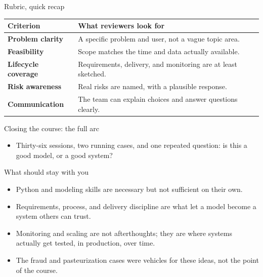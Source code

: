 \begin{frame}{Rubric, quick recap}
\begin{tabularx}{\textwidth}{>{\bfseries}l X}
Criterion & What reviewers look for \\
\toprule
Problem clarity & A specific problem and user, not a vague topic area. \\
Feasibility & Scope matches the time and data actually available. \\
Lifecycle coverage & Requirements, delivery, and monitoring are at least sketched. \\
Risk awareness & Real risks are named, with a plausible response. \\
Communication & The team can explain choices and answer questions clearly. \\
\bottomrule
\end{tabularx}
\coursefooter
\end{frame}

\begin{frame}{Closing the course: the full arc}
\centering
{}
\vspace{0.4em}
\begin{itemize}
\item Thirty-six sessions, two running cases, and one repeated question: is this a good model, or a good system?
\end{itemize}
\coursefooter
\end{frame}

\begin{frame}{What should stay with you}
\begin{itemize}
\item Python and modeling skills are necessary but not sufficient on their own.
\item Requirements, process, and delivery discipline are what let a model become a system others can trust.
\item Monitoring and scaling are not afterthoughts; they are where systems actually get tested, in production, over time.
\item The fraud and pasteurization cases were vehicles for these ideas, not the point of the course.
\end{itemize}
\coursefooter
\end{frame}

